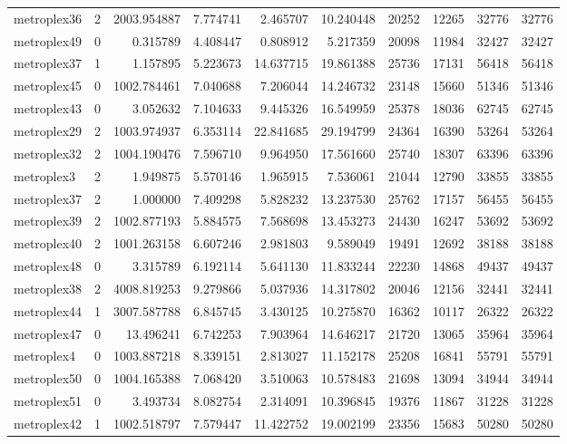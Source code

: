 \begin{longtable}{|l|r|r|r|r|r|r|r|r|r|}
metroplex36 & 2 & 2003.954887 & 7.774741 & 2.465707 & 10.240448 & 20252 & 12265 & 32776 & 32776 \\
metroplex49 & 0 & 0.315789 & 4.408447 & 0.808912 & 5.217359 & 20098 & 11984 & 32427 & 32427 \\
metroplex37 & 1 & 1.157895 & 5.223673 & 14.637715 & 19.861388 & 25736 & 17131 & 56418 & 56418 \\
metroplex45 & 0 & 1002.784461 & 7.040688 & 7.206044 & 14.246732 & 23148 & 15660 & 51346 & 51346 \\
metroplex43 & 0 & 3.052632 & 7.104633 & 9.445326 & 16.549959 & 25378 & 18036 & 62745 & 62745 \\
metroplex29 & 2 & 1003.974937 & 6.353114 & 22.841685 & 29.194799 & 24364 & 16390 & 53264 & 53264 \\
metroplex32 & 2 & 1004.190476 & 7.596710 & 9.964950 & 17.561660 & 25740 & 18307 & 63396 & 63396 \\
metroplex3 & 2 & 1.949875 & 5.570146 & 1.965915 & 7.536061 & 21044 & 12790 & 33855 & 33855 \\
metroplex37 & 2 & 1.000000 & 7.409298 & 5.828232 & 13.237530 & 25762 & 17157 & 56455 & 56455 \\
metroplex39 & 2 & 1002.877193 & 5.884575 & 7.568698 & 13.453273 & 24430 & 16247 & 53692 & 53692 \\
metroplex40 & 2 & 1001.263158 & 6.607246 & 2.981803 & 9.589049 & 19491 & 12692 & 38188 & 38188 \\
metroplex48 & 0 & 3.315789 & 6.192114 & 5.641130 & 11.833244 & 22230 & 14868 & 49437 & 49437 \\
metroplex38 & 2 & 4008.819253 & 9.279866 & 5.037936 & 14.317802 & 20046 & 12156 & 32441 & 32441 \\
metroplex44 & 1 & 3007.587788 & 6.845745 & 3.430125 & 10.275870 & 16362 & 10117 & 26322 & 26322 \\
metroplex47 & 0 & 13.496241 & 6.742253 & 7.903964 & 14.646217 & 21720 & 13065 & 35964 & 35964 \\
metroplex4 & 0 & 1003.887218 & 8.339151 & 2.813027 & 11.152178 & 25208 & 16841 & 55791 & 55791 \\
metroplex50 & 0 & 1004.165388 & 7.068420 & 3.510063 & 10.578483 & 21698 & 13094 & 34944 & 34944 \\
metroplex51 & 0 & 3.493734 & 8.082754 & 2.314091 & 10.396845 & 19376 & 11867 & 31228 & 31228 \\
metroplex42 & 1 & 1002.518797 & 7.579447 & 11.422752 & 19.002199 & 23356 & 15683 & 50280 & 50280 \\

\end{longtable}
